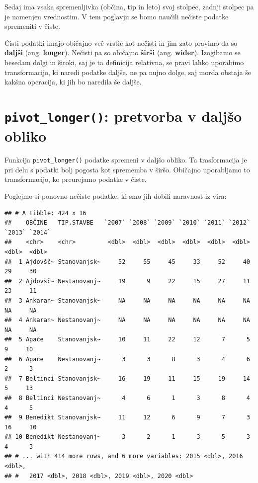 \documentclass[
]{book}
\begin{document}
Sedaj ima vsaka spremenljivka (občina, tip in leto) svoj stolpec, zadnji stolpec pa je namenjen vrednostim. V tem poglavju se bomo naučili nečiste podatke spremeniti v čiste.

Čisti podatki imajo običajno več vrstic kot nečisti in jim zato pravimo da so \textbf{daljši} (ang. \textbf{longer}). Nečisti pa so običajno \textbf{širši} (ang. \textbf{wider}). Izogibamo se besedam dolgi in široki, saj je ta definicija relativna, se pravi lahko uporabimo transformacijo, ki naredi podatke daljše, ne pa nujno dolge, saj morda obstaja še kakšna operacija, ki jih bo naredila še daljše.

\hypertarget{pivot_longer-pretvorba-v-daljux161o-obliko}{%
\section{\texorpdfstring{\texttt{pivot\_longer()}: pretvorba v daljšo obliko}{pivot\_longer(): pretvorba v daljšo obliko}}\label{pivot_longer-pretvorba-v-daljux161o-obliko}}

Funkcija \texttt{pivot\_longer()} podatke spremeni v daljšo obliko. Ta trasformacija je pri delu s podatki bolj pogosta kot sprememba v širšo. Običajno uporabljamo to transformacijo, ko preurejamo podatke v čiste.

Poglejmo si ponovno nečiste podatke, ki smo jih dobili naravnost iz vira:

\begin{verbatim}
## # A tibble: 424 x 16
##    OBČINE   TIP.STAVBE   `2007` `2008` `2009` `2010` `2011` `2012` `2013` `2014`
##    <chr>    <chr>         <dbl>  <dbl>  <dbl>  <dbl>  <dbl>  <dbl>  <dbl>  <dbl>
##  1 Ajdovšč~ Stanovanjsk~     52     55     45     33     52     40     29     30
##  2 Ajdovšč~ Nestanovanj~     19      9     22     15     27     11     23     11
##  3 Ankaran~ Stanovanjsk~     NA     NA     NA     NA     NA     NA     NA     NA
##  4 Ankaran~ Nestanovanj~     NA     NA     NA     NA     NA     NA     NA     NA
##  5 Apače    Stanovanjsk~     10     11     22     12      7      5      9     10
##  6 Apače    Nestanovanj~      3      3      8      3      4      6      2      3
##  7 Beltinci Stanovanjsk~     16     19     11     15     19     14      5     13
##  8 Beltinci Nestanovanj~      4      6      1      3      8      4      4      5
##  9 Benedikt Stanovanjsk~     11     12      6      9      7      3     16     10
## 10 Benedikt Nestanovanj~      3      2      1      3      5      3      4      3
## # ... with 414 more rows, and 6 more variables: 2015 <dbl>, 2016 <dbl>,
## #   2017 <dbl>, 2018 <dbl>, 2019 <dbl>, 2020 <dbl>
\end{verbatim}
\end{document}

